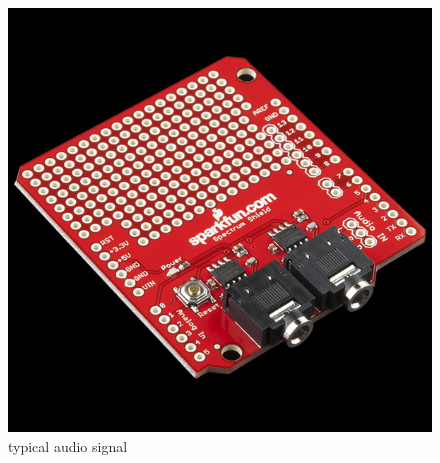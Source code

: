 \documentclass[12pt,a4paper,journal]{IEEEtran}
\begin{document}
\begin{figure}[ht]
  \centering
  \includegraphics[width=0.7\linewidth]{spectrumshield.jpg}
  \caption{typical audio signal}
  \label{fig:tas4}
\end{figure}
\end{document}
